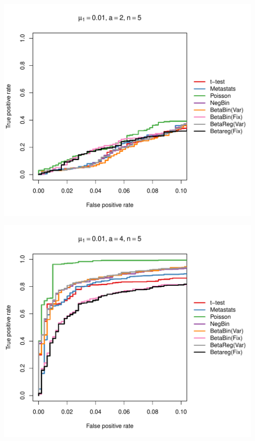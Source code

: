 \documentclass[12pt]{article}\usepackage{graphicx, color}
\makeatletter
\def\maxwidth{ %
  \ifdim\Gin@nat@width>\linewidth
    \linewidth
  \else
    \Gin@nat@width
  \fi
}
\newenvironment{knitrout}{}{} %
\makeatother
\begin{document}
\begin{knitrout}
{\centering \includegraphics[width=\maxwidth]{figure/rocs47} 

}




{\centering \includegraphics[width=\maxwidth]{figure/rocs48} 

}





\end{knitrout}
\end{document}
